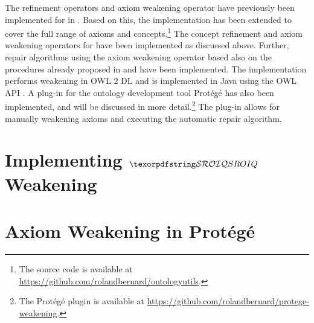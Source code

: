 
The refinement operators and axiom weakening operator have previously been implemented for \ALC in \cite{troquard2018repairing}. Based on this, the implementation has been extended to cover the full range of \SROIQ axioms and concepts.\footnote{The source code is available at \url{https://github.com/rolandbernard/ontologyutils}.} The concept refinement and axiom weakening operators for \SROIQ have been implemented as discussed above. Further, repair algorithms using the axiom weakening operator based also on the procedures already proposed in \cite{troquard2018repairing} and \cite{confalonieri2020towards} have been implemented. The implementation performs weakening in OWL 2 DL \cite{motik2012ontology} and is implemented in Java using the OWL API \cite{horridge2011owl,owlapi,matentzoglu2016introduction}. A plug-in for the ontology development tool Protégé has also been implemented, and will be discussed in more detail.\footnote{The Protégé plugin is available at \url{https://github.com/rolandbernard/protege-weakening}.} The plug-in allows for manually weakening axioms and executing the automatic repair algorithm.

\section{Implementing \texorpdfstring{$\SROIQ$}{SROIQ} Weakening}\label{prototype}



\section{Axiom Weakening in Protégé}\label{protege}


